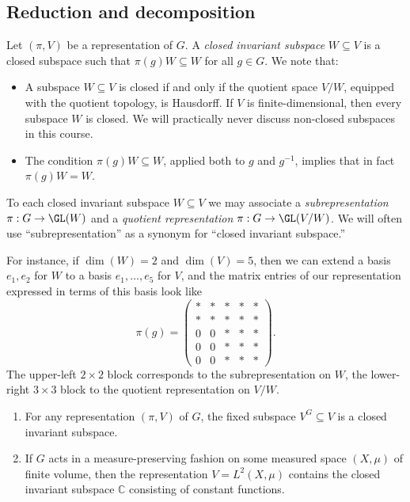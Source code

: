 \documentclass[reqno]{amsart} 
\begin{document}
\subsection{Reduction and decomposition}
\begin{definition}
  Let $(\pi,V)$ be a representation of $G$.  A \emph{closed invariant subspace} $W \subseteq V$ is a closed subspace such that $\pi(g) W \subseteq W$ for all $g \in G$.  We note that:
  \begin{itemize}
  \item A subspace $W \subseteq V$ is closed if and only if the quotient space $V/W$, equipped with the quotient topology, is Hausdorff.  If $V$ is finite-dimensional, then every subspace $W$ is closed.  We will practically never discuss non-closed subspaces in this course.
  \item The condition $\pi(g) W \subseteq W$, applied both to $g$ and $g^{-1}$, implies that in fact $\pi(g) W = W$.
  \end{itemize}
  To each closed invariant subspace $W \subseteq V$ we may associate a \emph{subrepresentation} $\pi : G \rightarrow \GL(W)$ and a \emph{quotient representation} $\pi : G \rightarrow \GL(V/W)$.  We will often use ``subrepresentation'' as a synonym for ``closed invariant subspace.''
\end{definition}
For instance, if $\dim(W) = 2$ and $\dim(V) = 5$, then we can extend a basis $e_1,e_2$ for $W$ to a basis $e_1,\dotsc,e_5$ for $V$, and the matrix entries of our representation expressed in terms of this basis look like
\begin{equation*}
  \pi(g) =
  \begin{pmatrix}
    \ast & \ast & \ast & \ast & \ast \\
    \ast & \ast & \ast & \ast & \ast \\
    0 & 0 & \ast & \ast & \ast \\
    0 & 0 & \ast & \ast & \ast \\
    0 & 0 & \ast & \ast & \ast
  \end{pmatrix}
.
\end{equation*}
The upper-left $2 \times 2$ block corresponds to the subrepresentation on $W$, the lower-right $3 \times 3$ block to the quotient representation on $V/W$.

\begin{example}
  \begin{enumerate}
  \item For any representation $(\pi,V)$ of $G$, the fixed subspace $V^G \subseteq V$ is a closed invariant subspace.
  \item If $G$ acts in a measure-preserving fashion on some measured space $(X,\mu)$ of finite volume, then the representation $V = L^2(X,\mu)$ contains the closed invariant subspace $\mathbb{C}$ consisting of constant functions.
  \end{enumerate}
\end{example}
\end{document}
